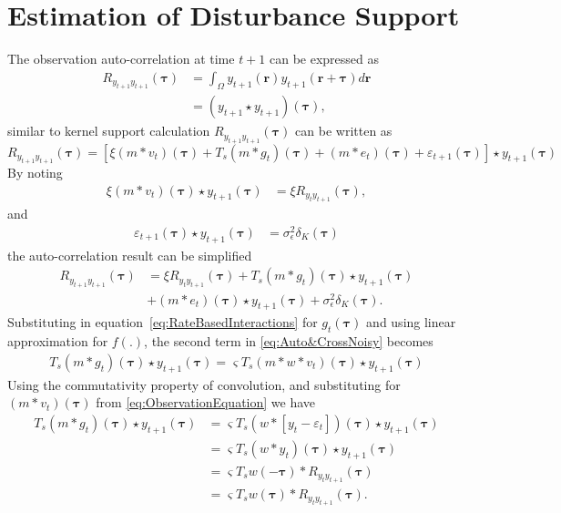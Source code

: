 \documentclass[]{article}
\begin{document}
\section*{Estimation of Disturbance Support}
The observation auto-correlation at time $t+1$ can be expressed as
\begin{align}
	R_{y_{t+1}y_{t+1}}(\boldsymbol{\tau})& =\int_{\Omega} y_{t+1}(\mathbf{r}) y_{t+1}(\mathbf{r}+\boldsymbol{\tau}) d\mathbf{r}
 \nonumber \\
 &=(y_{t+1} \star y_{t+1})(\boldsymbol\tau),
\end{align}
similar to  kernel support calculation $R_{y_{t+1}y_{t+1}}(\boldsymbol{\tau})$ can be written as 
\begin{equation}
	R_{y_{t+1}y_{t+1}}(\boldsymbol{\tau}) = \left[  \xi(m\ast v_{t})(\boldsymbol\tau)+T_s(m\ast g_{t})(\boldsymbol\tau)+(m\ast e_{t})(\boldsymbol{\tau})+\varepsilon_{t+1}(\boldsymbol\tau)\right] \star  y_{t+1}(\boldsymbol{\tau}) 
\end{equation}
By noting 
\begin{align}\label{eq:term1}
  \xi(m\ast v_{t})(\boldsymbol\tau)\star  y_{t+1}(\boldsymbol{\tau})&=\xi R_{y_ty_{t+1}}(\boldsymbol{\tau}),
\end{align}
and
\begin{align}\label{eq:term2}
 \varepsilon_{t+1}(\boldsymbol\tau)\star y_{t+1}(\boldsymbol\tau)&=\sigma_{\epsilon}^2\delta_K(\boldsymbol{\tau})
\end{align}
the auto-correlation result can be simplified
\begin{align}\label{eq:Auto&CrossNoisy}
	R_{y_{t+1}y_{t+1}}(\boldsymbol{\tau}) &= \xi R_{y_ty_{t+1}}(\boldsymbol{\tau})+ T_s (m\ast g_t)(\boldsymbol\tau) \star y_{t+1}(\boldsymbol\tau) \nonumber \\
	&+(m\ast e_t)(\boldsymbol\tau)\star y_{t+1}(\boldsymbol\tau)+\sigma_{\epsilon}^2\delta_K(\boldsymbol{\tau}).
\end{align}
Substituting in equation~\ref{eq:RateBasedInteractions} for $g_t(\boldsymbol\tau)$ and using linear approximation for $f(.)$, the second term in \eqref{eq:Auto&CrossNoisy} becomes
\begin{align}
	 T_s (m\ast g_t)(\boldsymbol\tau) \star y_{t+1}(\boldsymbol\tau) = \varsigma T_s(m\ast w*v_t)(\boldsymbol\tau) \star y_{t+1}(\boldsymbol\tau)
\end{align}
Using the commutativity property of convolution, and substituting for $(m\ast v_t)(\boldsymbol\tau)$ from \ref{eq:ObservationEquation} we have
\begin{align}\label{eq:term3}
	T_s (m\ast g_t)(\boldsymbol\tau) \star y_{t+1}(\boldsymbol\tau)&=  \varsigma T_s \left( w\ast \left[y_t-\varepsilon_t \right]\right)(\boldsymbol\tau) \star y_{t+1}(\boldsymbol\tau) \nonumber \\
&=\varsigma T_s(w\ast y_t)(\boldsymbol{\tau}) \star  y_{t+1}(\boldsymbol{\tau}) \nonumber \\
&=\varsigma T_s w(-\boldsymbol\tau)\ast R_{y_ty_{t+1}} (\boldsymbol{\tau}) \nonumber \\
&=\varsigma T_s w(\boldsymbol\tau)\ast R_{y_ty_{t+1}} (\boldsymbol{\tau}).
\end{align}
\end{document}
